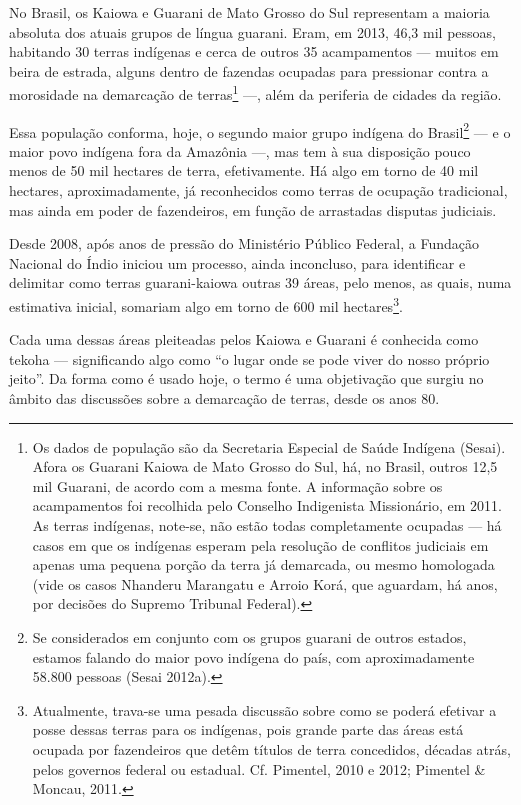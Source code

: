 \documentclass{article}
\begin{document}
No Brasil, os Kaiowa e Guarani de Mato Grosso do Sul representam a
maioria absoluta dos atuais grupos de l\'ingua guarani. Eram, em 2013,
46,3 mil pessoas, habitando 30 terras ind\'igenas e cerca de outros 35
acampamentos --- muitos em beira de estrada, alguns dentro de fazendas
ocupadas para pressionar contra a morosidade na demarca\c{c}\~ao de
terras\footnote{ Os dados de popula\c{c}\~ao s\~ao da Secretaria
Especial de Sa\'ude Ind\'igena (Sesai). Afora os Guarani Kaiowa de Mato
Grosso do Sul, h\'a, no Brasil, outros 12,5 mil Guarani, de acordo com
a mesma fonte. A informa\c{c}\~ao sobre os acampamentos foi recolhida
pelo Conselho Indigenista Mission\'ario, em 2011. As terras
ind\'igenas, note-se, n\~ao est\~ao todas completamente ocupadas ---
h\'a casos em que os ind\'igenas esperam pela resolu\c{c}\~ao de
conflitos judiciais em apenas uma pequena por\c{c}\~ao da terra j\'a
demarcada, ou mesmo homologada (vide os casos Nhanderu Marangatu e
Arroio Kor\'a, que aguardam, h\'a anos, por decis\~oes do Supremo
Tribunal Federal).} ---, al\'em da periferia de cidades da regi\~ao.

Essa popula\c{c}\~ao conforma, hoje, o segundo maior grupo ind\'igena do
Brasil\footnote{ Se considerados em conjunto com os grupos guarani de
outros estados, estamos falando do maior povo ind\'igena do pa\'is, com
aproximadamente 58.800 pessoas (Sesai 2012a).} --- e o maior povo
ind\'igena fora da Amaz\^onia ---, mas tem \`a sua disposi\c{c}\~ao
pouco menos de 50 mil hectares de terra, efetivamente. H\'a algo em
torno de 40 mil hectares, aproximadamente, j\'a reconhecidos como
terras de ocupa\c{c}\~ao tradicional, mas ainda em poder de
fazendeiros, em fun\c{c}\~ao de arrastadas disputas judiciais. 

Desde 2008, ap\'os anos de press\~ao do Minist\'erio P\'ublico Federal,
a Funda\c{c}\~ao Nacional do \'Indio iniciou um processo, ainda
inconcluso, para identificar e delimitar como terras guarani-kaiowa
outras 39 \'areas, pelo menos, as quais, numa estimativa inicial,
somariam algo em torno de 600 mil hectares\footnote{ Atualmente,
trava-se uma pesada discuss\~ao sobre como se poder\'a efetivar a posse
dessas terras para os ind\'igenas, pois grande parte das \'areas est\'a
ocupada por fazendeiros que det\^em t\'itulos de terra concedidos,
d\'ecadas atr\'as, pelos governos federal ou estadual. Cf. Pimentel,
2010 e 2012; Pimentel \& Moncau, 2011.  }. 

Cada uma dessas \'areas pleiteadas pelos Kaiowa e Guarani \'e conhecida
como tekoha --- significando algo como {\textquotedblleft}o lugar onde
se pode viver do nosso pr\'oprio jeito{\textquotedblright}. Da forma
como \'e usado hoje, o termo \'e uma objetiva\c{c}\~ao que surgiu no
\^ambito das discuss\~oes sobre a demarca\c{c}\~ao de terras, desde os
anos 80. 
\end{document}
